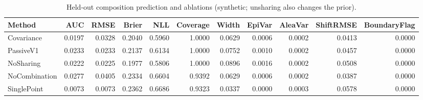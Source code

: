 \begin{table}[t]
\caption{Held-out composition prediction and ablations (synthetic; unsharing also changes the prior).}
\label{tab:experiment3}
\begin{tabular}{lrrrrrrrrrr}
\toprule
Method & AUC & RMSE & Brier & NLL & Coverage & Width & EpiVar & AleaVar & ShiftRMSE & BoundaryFlag \\
\midrule
Covariance & 0.0197 & 0.0328 & 0.2040 & 0.5960 & 1.0000 & 0.0629 & 0.0006 & 0.0002 & 0.0413 & 0.0000 \\
PassiveV1 & 0.0233 & 0.0233 & 0.2137 & 0.6134 & 1.0000 & 0.0752 & 0.0010 & 0.0002 & 0.0457 & 0.0000 \\
NoSharing & 0.0222 & 0.0225 & 0.1977 & 0.5806 & 1.0000 & 0.0896 & 0.0016 & 0.0002 & 0.0508 & 0.0000 \\
NoCombination & 0.0277 & 0.0405 & 0.2334 & 0.6604 & 0.9392 & 0.0629 & 0.0006 & 0.0002 & 0.0387 & 0.0000 \\
SinglePoint & 0.0073 & 0.0073 & 0.2362 & 0.6686 & 0.9323 & 0.0337 & 0.0000 & 0.0003 & 0.0578 & 0.0000 \\
\bottomrule
\end{tabular}
\end{table}
